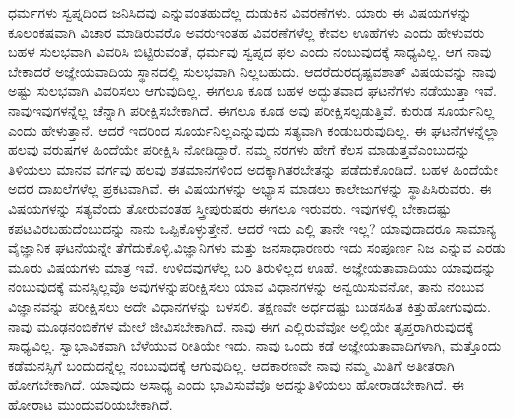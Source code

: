 ಧರ್ಮಗಳು ಸ್ವಪ್ನದಿಂದ ಜನಿಸಿದವು ಎನ್ನುವಂತಹುದೆಲ್ಲ ದುಡುಕಿನ ವಿವರಣೆಗಳು. ಯಾರು ಈ ವಿಷಯಗಳನ್ನು ಕೂಲಂಕಷವಾಗಿ ವಿಚಾರ ಮಾಡಿರುವರೊ ಅವರು\break ಇಂತಹ ವಿವರಣೆಗಳೆಲ್ಲ ಕೇವಲ ಊಹೆಗಳು ಎಂದು ಹೇಳುವರು ಬಹಳ ಸುಲಭವಾಗಿ ವಿವರಿಸಿ ಬಿಟ್ಟಿರುವಂತೆ, ಧರ್ಮವು ಸ್ವಪ್ನದ ಫಲ ಎಂದು ನಂಬುವುದಕ್ಕೆ ಸಾಧ್ಯವಿಲ್ಲ. ಆಗ ನಾವು ಬೇಕಾದರೆ ಅಜ್ಞೇಯವಾದಿಯ ಸ್ಥಾನದಲ್ಲಿ ಸುಲಭವಾಗಿ ನಿಲ್ಲಬಹುದು. ಆದರೆ\break ದುರದೃಷ್ಟವಶಾತ್​ ವಿಷಯವನ್ನು ನಾವು ಅಷ್ಟು ಸುಲಭವಾಗಿ ವಿವರಿಸಲು ಆಗುವುದಿಲ್ಲ. ಈಗಲೂ ಕೂಡ ಬಹಳ ಅದ್ಭುತವಾದ ಘಟನೆಗಳು ನಡೆಯುತ್ತಾ ಇವೆ. ನಾವು\break ಇವುಗಳನ್ನೆಲ್ಲ ಚೆನ್ನಾಗಿ ಪರೀಕ್ಷಿಸಬೇಕಾಗಿದೆ. ಈಗಲೂ ಕೂಡ ಅವು ಪರೀಕ್ಷಿಸಲ್ಪಡುತ್ತಿವೆ. ಕುರುಡ ಸೂರ್ಯನಿಲ್ಲ ಎಂದು ಹೇಳುತ್ತಾನೆ. ಆದರೆ ಇದರಿಂದ ಸೂರ್ಯನಿಲ್ಲ\break ಎನ್ನುವುದು ಸತ್ಯವಾಗಿ ಕಂಡುಬರುವುದಿಲ್ಲ. ಈ ಘಟನೆಗಳನ್ನೆಲ್ಲಾ ಹಲವು ವರುಷಗಳ ಹಿಂದೆಯೇ ಪರೀಕ್ಷಿಸಿ ನೋಡಿದ್ದಾರೆ. ನಮ್ಮ ನರಗಳು ಹೇಗೆ ಕೆಲಸ ಮಾಡುತ್ತವೆ\break ಎಂಬುದನ್ನು ತಿಳಿಯಲು ಮಾನವ ವರ್ಗವು ಹಲವು ಶತಮಾನಗಳಿಂದ ಅದಕ್ಕಾಗಿ\break ತರಬೇತನ್ನು ಪಡೆದುಕೊಂಡಿದೆ. ಬಹಳ ಹಿಂದೆಯೇ ಅದರ ದಾಖಲೆಗಳೆಲ್ಲ ಪ್ರಕಟವಾಗಿವೆ. ಈ ವಿಷಯಗಳನ್ನು ಅಭ್ಯಾಸ ಮಾಡಲು ಕಾಲೇಜುಗಳನ್ನು ಸ್ಥಾಪಿಸಿರುವರು. ಈ ವಿಷಯಗಳನ್ನು ಸತ್ಯವೆಂದು ತೋರುವಂತಹ ಸ್ತ್ರೀಪುರುಷರು ಈಗಲೂ ಇರುವರು. ಇವುಗಳಲ್ಲಿ ಬೇಕಾದಷ್ಟು ಕಪಟವಿರಬಹುದೆಂಬುದನ್ನು ನಾನು ಒಪ್ಪಿಕೊಳ್ಳುತ್ತೇನೆ. ಆದರೆ ಇದು ಎಲ್ಲಿ ತಾನೇ ಇಲ್ಲ? ಯಾವುದಾದರೂ ಸಾಮಾನ್ಯ ವೈಜ್ಞಾನಿಕ ಘಟನೆಯನ್ನೇ ತೆಗೆದುಕೊಳ್ಳಿ.ವಿಜ್ಞಾನಿಗಳು ಮತ್ತು ಜನಸಾಧಾರಣರು ಇದು ಸಂಪೂರ್ಣ ನಿಜ ಎನ್ನುವ ಎರಡು ಮೂರು ವಿಷಯಗಳು ಮಾತ್ರ ಇವೆ. ಉಳಿದವುಗಳೆಲ್ಲ ಬರಿ ತಿರುಳಿಲ್ಲದ ಊಹೆ. ಅಜ್ಞೇಯತಾವಾದಿಯು ಯಾವುದನ್ನು ನಂಬುವುದಕ್ಕೆ ಮನಸ್ಸಿಲ್ಲವೊ ಅವುಗಳನ್ನು\break ಪರೀಕ್ಷಿಸಲು ಯಾವ ವಿಧಾನಗಳನ್ನು ಅನ್ವಯಿಸುವನೋ, ತಾನು ನಂಬುವ ವಿಜ್ಞಾನವನ್ನು ಪರೀಕ್ಷಿಸಲು ಅದೇ ವಿಧಾನಗಳನ್ನು ಬಳಸಲಿ. ತಕ್ಷಣವೇ ಅರ್ಧದಷ್ಟು ಬುಡಸಹಿತ ಕಿತ್ತುಹೋಗುವುದು. ನಾವು ಮೂಢನಂಬಿಕೆಗಳ ಮೇಲೆ ಜೀವಿಸಬೇಕಾಗಿದೆ. ನಾವು ಈಗ ಎಲ್ಲಿರುವೆವೋ ಅಲ್ಲಿಯೇ ತೃಪ್ತರಾಗಿರುವುದಕ್ಕೆ ಸಾಧ್ಯವಿಲ್ಲ. ಸ್ವಾಭಾವಿಕವಾಗಿ ಬೆಳೆಯುವ ರೀತಿಯೇ ಇದು. ನಾವು ಒಂದು ಕಡೆ ಅಜ್ಞೇಯತಾವಾದಿಗಳಾಗಿ, ಮತ್ತೊಂದು ಕಡೆ\break ಮನಸ್ಸಿಗೆ ಬಂದುದನ್ನೆಲ್ಲ ನಂಬುವುದಕ್ಕೆ ಆಗುವುದಿಲ್ಲ. ಆದಕಾರಣವೇ ನಾವು ನಮ್ಮ ಮಿತಿಗೆ ಅತೀತರಾಗಿ ಹೋಗಬೇಕಾಗಿದೆ. ಯಾವುದು ಅಸಾಧ್ಯ ಎಂದು ಭಾವಿಸುವೆವೊ ಅದನ್ನು\break ತಿಳಿಯಲು ಹೋರಾಡಬೇಕಾಗಿದೆ. ಈ ಹೋರಾಟ ಮುಂದುವರಿಯಬೇಕಾಗಿದೆ.

